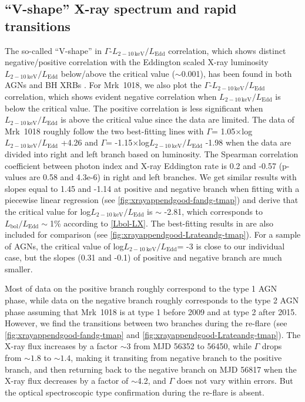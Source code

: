 \documentclass[twocolumn]{aastex63}
\begin{document}
\subsection{``V-shape'' X-ray spectrum and rapid transitions}
The so-called ``V-shape'' in $\Gamma$-$L_\mathrm{2-10\,keV}/L_\mathrm{Edd}$ correlation, which shows distinct negative/positive correlation with the Eddington scaled X-ray luminosity $L_\mathrm{2-10~ keV}/L_\mathrm{Edd}$ below/above the critical value ($\sim$0.001), has been found in both AGNs and BH XRBs \citep[e.g.][]{2011A&A...530A.149Y,2015MNRAS.447.1692Y}. For Mrk~1018, we also plot the $\Gamma$-$L_\mathrm{2-10\,keV}/L_\mathrm{Edd}$ correlation, which shows evident negative correlation when $L_\mathrm{2-10\,keV}/L_\mathrm{Edd}$ is below the critical value. The positive correlation is less significant when $L_\mathrm{2-10\,keV}/L_\mathrm{Edd}$ is above the critical value since the data are limited. The data of Mrk~1018 roughly follow the two best-fitting lines with $\Gamma$= 1.05$\times$log$L_\mathrm{2-10~ keV}/L_\mathrm{Edd}$ +4.26 and $\Gamma$= -1.15$\times$log$L_\mathrm{2-10~ keV}/L_\mathrm{Edd}$ -1.98 when the data are divided into right and left branch based on luminosity. The Spearman correlation coefficient between photon index and X-ray Eddington rate is 0.2 and -0.57 (p-values are 0.58 and 4.3e-6) in right and left branches. We get similar results with slopes equal to 1.45 and -1.14 at positive and negative branch when fitting with a piecewise linear regression (see \autoref{fig:xrayappendgood-fandg-tmap}) and derive that the critical value for log$L_\mathrm{2-10~ keV}/L_\mathrm{Edd}$ is $\sim$ -2.81, which corresponds to $L_\mathrm{bol}/L_\mathrm{Edd}\sim$1\% according to \autoref{Lbol-LX}. The best-fitting results in \citet{2015MNRAS.447.1692Y} are also included for comparison (see \autoref{fig:xrayappendgood-Lrateandg-tmap}). For a sample of AGNs, the critical value of log$L_\mathrm{2-10~ keV}/L_\mathrm{Edd}$= -3 is close to our individual case, but the slopes (0.31 and -0.1) of positive and negative branch are much smaller. 

Most of data on the positive branch roughly correspond to the type 1 AGN phase, while data on the negative branch roughly corresponds to the type 2 AGN phase assuming that Mrk~1018 is at type 1 before 2009 and at type 2 after 2015. However, we find the transitions between two branches during the re-flare (see \autoref{fig:xrayappendgood-fandg-tmap} and \autoref{fig:xrayappendgood-Lrateandg-tmap}). The X-ray flux increases by a factor $\sim3$ from MJD 56352 to 56450, while $\Gamma$ drops from $\sim1.8$ to $\sim1.4$, making it transiting from negative branch to the positive branch, and then returning back to the negative branch on MJD 56817 when the X-ray flux decreases by a factor of $\sim$4.2, and $\Gamma$ does not vary within errors. But the optical spectroscopic type confirmation during the re-flare is absent.
\end{document}
